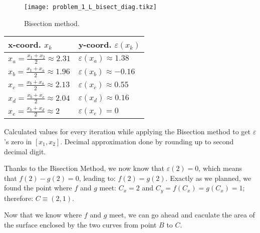 \begin{figure}[h] %
    \texttt{[image: problem\_1\_L\_bisect\_diag.tikz]}
    \caption{Bisection method.}%
    \label{fig:bisect}%
\end{figure}

\begin{margintable}[-0.8\textwidth]
    \begin{center}
        \footnotesize%
        \begin{tabular}{ll}
        \toprule
        x-coord. $x_k$ & y-coord. $\varepsilon(x_k)$\\
        \midrule
        $x_a = \frac{x_1 + x_2}{2} \approx 2.31$ & $\varepsilon(x_a) \approx 1.38 $\\
        $x_b = \frac{x_1 + x_a}{2} \approx 1.96$ & $\varepsilon(x_b) \approx -0.16 $\\
        $x_c = \frac{x_b + x_a}{2} \approx 2.13$ & $\varepsilon(x_c) \approx 0.55 $\\
        $x_d = \frac{x_b + x_c}{2} \approx 2.04$ & $\varepsilon(x_d) \approx 0.16 $\\
        $x_e = \frac{x_b + x_d}{2} \approx 2$ & $\varepsilon(x_e) = 0 $\\
        \bottomrule
        \end{tabular}
    \end{center}
    \caption{Calculated values for every iteration while applying the Bisection method to get
    $\varepsilon$'s zero in $[x_1, x_2]$. Decimal approximation done by rounding up to
    second decimal digit.}
    \label{tab:bisectcalc}
\end{margintable}

Thanks to the Bisection Method, we now know that $\varepsilon(2) = 0$, which means that
$f(2) - g(2) = 0$, leading to: $f(2) = g(2)$. Exactly as we planned, we found the point where
$f$ and $g$ meet: $C_x = 2$ and $C_y = f(C_x) = g(C_x) = 1$; therefore: $C \equiv (2,1)$.

Now that we know where $f$ and $g$ meet, we can go ahead and
caculate the area of the surface enclosed by the two curves from point $B$ to $C$.
